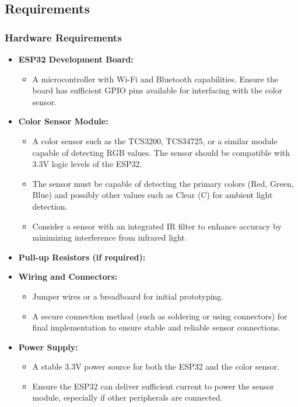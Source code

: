 \subsection*{Requirements}

\subsubsection*{Hardware Requirements}

\begin{itemize}
	\item \textbf{ESP32 Development Board:} 
	\begin{itemize}
		\item A microcontroller with Wi-Fi and Bluetooth capabilities. Ensure the board has sufficient GPIO pins available for interfacing with the color sensor.
	\end{itemize}
	
	\item \textbf{Color Sensor Module:}
	\begin{itemize}
		\item A color sensor such as the TCS3200, TCS34725, or a similar module capable of detecting RGB values. The sensor should be compatible with 3.3V logic levels of the ESP32.
		\item The sensor must be capable of detecting the primary colors (Red, Green, Blue) and possibly other values such as Clear (C) for ambient light detection.
		\item Consider a sensor with an integrated IR filter to enhance accuracy by minimizing interference from infrared light.
	\end{itemize}
	
	\item \textbf{Pull-up Resistors (if required):}

	
	\item \textbf{Wiring and Connectors:}
	\begin{itemize}
		\item Jumper wires or a breadboard for initial prototyping.
		\item A secure connection method (such as soldering or using connectors) for final implementation to ensure stable and reliable sensor connections.
	\end{itemize}
	
	\item \textbf{Power Supply:}
	\begin{itemize}
		\item A stable 3.3V power source for both the ESP32 and the color sensor.
		\item Ensure the ESP32 can deliver sufficient current to power the sensor module, especially if other peripherals are connected.
	\end{itemize}
\end{itemize}


